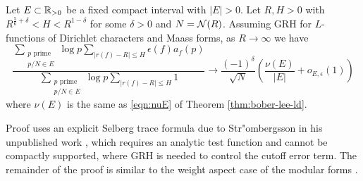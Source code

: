 \begin{theorem}
    Let $E \subset \mathbb{R}_{>0}$ be a fixed compact interval with $|E| > 0$.
    Let $R, H > 0$ with $R^{\frac{5}{6} + \delta} < H < R^{1 - \delta}$ for some $\delta > 0$ and $N = \mathcal{N}(R)$.
    Assuming GRH for $L$-functions of Dirichlet characters and Maass forms, as $R \to \infty$ we have
    \begin{equation}
        \frac{\sum_{\substack{p\text{ prime} \\ p / N \in E}} \log p \sum_{|r(f) - R| \le H} \epsilon(f) a_{f}(p)}{\sum_{\substack{p\text{ prime} \\ p / N \in E}} \log p \sum_{|r(f) - R| \le H} 1} \to \frac{(-1)^\delta}{\sqrt{N}} \left(\frac{\nu(E)}{|E|} + o_{E, \epsilon}(1)\right)
    \end{equation}
    where $\nu(E)$ is the same as \eqref{eqn:nuE} of Theorem \ref{thm:bober-lee-ld}.
\end{theorem}

Proof uses an explicit Selberg trace formula due to Str"ombergsson in his unpublished work \cite{strombergsson}, which requires an analytic test function and cannot be compactly supported, where GRH is needed to control the cutoff error term.
The remainder of the proof is similar to the weight aspect case of the modular forms \cite{bober2023murmurations}.


